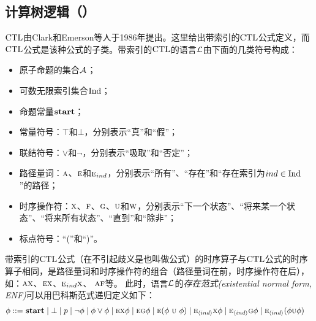 \subsection{计算树逻辑（\CTL）}
$\textrm{CTL}$由Clark和Emerson等人于1986年提出\cite{DBLP:journals/toplas/ClarkeES86}。这里给出带索引的$\textrm{CTL}$公式定义，而$\textrm{CTL}$公式是该种公式的子类。带索引的$\textrm{CTL}$的语言${\cal L}$由下面的几类符号构成：
\begin{itemize}
	\item 原子命题的集合${\cal A}$；
	\item 可数无限索引集合$\textrm{Ind}$；
	\item 命题常量$\textbf{start}$；
	\item 常量符号：$\top$和$\bot$，分别表示“真”和“假”；
	\item 联结符号：$\vee$和$\neg$，分别表示“吸取”和“否定”；
	\item 路径量词：$\textsc{a}$、$\textsc{e}$和$\textsc{e}_{ind}$，分别表示“所有”、“存在”和“存在索引为$ind\in \textrm{Ind}$”的路径；
	\item 时序操作符：$\textsc{x}$、$\textsc{f}$、$\textsc{g}$、$\textsc{u}$和$\textsc{w}$，分别表示“下一个状态”、“将来某一个状态”、“将来所有状态”、“直到”和“除非”；
	\item 标点符号：“(”和“)”。
\end{itemize}
带索引的$\textrm{CTL}$公式（在不引起歧义是也叫做公式）的时序算子与$\textrm{CTL}$公式的时序算子相同，是路径量词和时序操作符的组合（路径量词在前，时序操作符在后），如：$\textsc{a} \textsc{x}$、$\textsc{e} \textsc{x}$、$\textsc{e}_{ind} \textsc{x}$、 $\textsc{a} \textsc{f}$等。
此时，语言$\cal L$的\emph{存在范式(existential normal form, ENF)}可以用巴科斯范式递归定义如下：
	\begin{align*}
	\phi  ::= & \ \start\mid \bot %
	\mid p \mid\neg\phi \mid \phi\lor\phi \mid
	\EXIST \NEXT \phi \mid
	\EXIST \GLOBAL \phi \mid
	\EXIST (\phi\ \UNTILL\ \phi)\mid
	\EXIST_{\tuple{ind}}\NEXT \phi  \mid
	\EXIST_{\tuple{ind}}\GLOBAL \phi \mid
	\EXIST_{\tuple{ind}}(\phi \UNTILL \phi) %
\end{align*}

